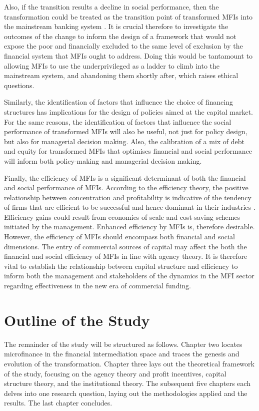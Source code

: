 \documentclass[a4paper,nobind]{templates/ociamthesis}
\begin{document}
Also, if the transition results a decline in social performance, then the transformation could be treated as the transition point of transformed MFIs into the mainstream banking system \autocite{kent2013bankers}. It is crucial therefore to investigate the outcomes of the change to inform the design of a framework that would not expose the poor and financially excluded to the same level of exclusion by the financial system that MFIs ought to address. Doing this would be tantamount to allowing MFIs to use the underprivileged as a ladder to climb into the mainstream system, and abandoning them shortly after, which raises ethical questions.

Similarly, the identification of factors that influence the choice of financing structures has implications for the design of policies aimed at the capital market. For the same reasons, the identification of factors that influence the social performance of transformed MFIs will also be useful, not just for policy design, but also for managerial decision making. Also, the calibration of a mix of debt and equity for transformed MFIs that optimises financial and social performance will inform both policy-making and managerial decision making.

Finally, the efficiency of MFIs is a significant determinant of both the financial and social performance of MFIs. According to the efficiency theory, the positive relationship between concentration and profitability is indicative of the tendency of firms that are efficient to be successful and hence dominant in their industries \autocite{lipczynski2005industrial}. Efficiency gains could result from economies of scale and cost-saving schemes initiated by the management. Enhanced efficiency by MFIs is, therefore desirable. However, the efficiency of MFIs should encompass both financial and social dimensions. The entry of commercial sources of capital may affect the both the financial and social efficiency of MFIs in line with agency theory. It is therefore vital to establish the relationship between capital structure and efficiency to inform both the management and stakeholders of the dynamics in the MFI sector regarding effectiveness in the new era of commercial funding.

\hypertarget{outline-of-the-study}{%
\section{Outline of the Study}\label{outline-of-the-study}}

\noindent The remainder of the study will be structured as follows. Chapter two locates microfinance in the financial intermediation space and traces the genesis and evolution of the transformation. Chapter three lays out the theoretical framework of the study, focusing on the agency theory and profit incentives, capital structure theory, and the institutional theory. The subsequent five chapters each delves into one research question, laying out the methodologies applied and the results. The last chapter concludes.
\end{document}
